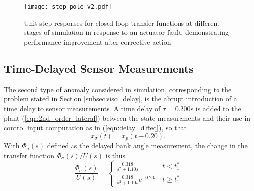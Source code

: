 \begin{figure}[h!]
	\centering
	\texttt{[image: step\_pole\_v2.pdf]}
	\caption{Unit step responses for closed-loop transfer functions at different stages of simulation in response to an actuator fault, demonstrating performance improvement after corrective action}
	\label{fig:step_pole}
\end{figure}

\subsection{Time-Delayed Sensor Measurements}\label{subsec:siso_delay_sims}
The second type of anomaly considered in simulation, corresponding to the problem stated in Section \ref{subsec:siso_delay}, is the abrupt introduction of a time delay to sensor measurements. A time delay of $\tau = 0.200$s is added to the plant (\ref{eqn:2nd_order_lateral}) between the state measurements and their use in control input computation as in (\ref{eqn:delay_diffeq}), so that
\begin{equation}
	x_\sigma(t) = x_p(t - 0.20).
\end{equation}
With $\Phi_\sigma(s)$ defined as the delayed bank angle measurement, the change in the transfer function $\Phi_\sigma(s)/U(s)$ is thus
\begin{equation}
		\frac{\Phi_\sigma(s)}{U(s)} = \begin{cases}
			\frac{0.318}{s^2 + 1.10s} & t < t_1^*\\
			\frac{0.318}{s^2 + 1.10s}e^{-0.20 s} & t \geq t_1^*
		\end{cases} 
\end{equation}

